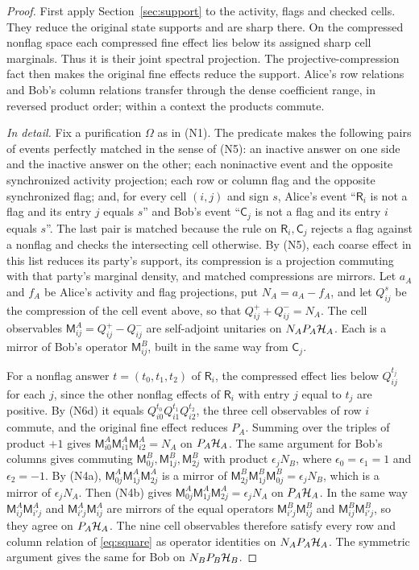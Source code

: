 \begin{proof}
First apply Section~\ref{sec:support} to the activity, flags and checked cells. They reduce the original state supports and are sharp there. On the compressed nonflag space each compressed fine effect lies below its assigned sharp cell marginals. Thus it is their joint spectral projection. The projective-compression fact then makes the original fine effects reduce the support. Alice's row relations and Bob's column relations transfer through the dense coefficient range, in reversed product order; within a context the products commute.

\emph{In detail.} Fix a purification $\Omega$ as in (N1). The predicate makes the following pairs of events perfectly matched in the sense of (N5): an inactive answer on one side and the inactive answer on the other; each noninactive event and the opposite synchronized activity projection; each row or column flag and the opposite synchronized flag; and, for every cell $(i,j)$ and sign $s$, Alice's event ``$\mathsf R_i$ is not a flag and its entry $j$ equals $s$'' and Bob's event ``$\mathsf C_j$ is not a flag and its entry $i$ equals $s$''. The last pair is matched because the rule on $\mathsf R_i,\mathsf C_j$ rejects a flag against a nonflag and checks the intersecting cell otherwise. By (N5), each coarse effect in this list reduces its party's support, its compression is a projection commuting with that party's marginal density, and matched compressions are mirrors. Let $a_A$ and $f_A$ be Alice's activity and flag projections, put $N_A=a_A-f_A$, and let $Q^s_{ij}$ be the compression of the cell event above, so that $Q^+_{ij}+Q^-_{ij}=N_A$. The cell observables $\mathsf M^A_{ij}=Q^+_{ij}-Q^-_{ij}$ are self-adjoint unitaries on $N_AP_A\mathcal H_A$. Each is a mirror of Bob's operator $\mathsf M^B_{ij}$, built in the same way from $\mathsf C_j$.

For a nonflag answer $t=(t_0,t_1,t_2)$ of $\mathsf R_i$, the compressed effect lies below $Q^{t_j}_{ij}$ for each $j$, since the other nonflag effects of $\mathsf R_i$ with entry $j$ equal to $t_j$ are positive. By (N6d) it equals $Q^{t_0}_{i0}Q^{t_1}_{i1}Q^{t_2}_{i2}$, the three cell observables of row $i$ commute, and the original fine effect reduces $P_A$. Summing over the triples of product $+1$ gives $\mathsf M^A_{i0}\mathsf M^A_{i1}\mathsf M^A_{i2}=N_A$ on $P_A\mathcal H_A$. The same argument for Bob's columns gives commuting $\mathsf M^B_{0j},\mathsf M^B_{1j},\mathsf M^B_{2j}$ with product $\epsilon_jN_B$, where $\epsilon_0=\epsilon_1=1$ and $\epsilon_2=-1$. By (N4a), $\mathsf M^A_{0j}\mathsf M^A_{1j}\mathsf M^A_{2j}$ is a mirror of $\mathsf M^B_{2j}\mathsf M^B_{1j}\mathsf M^B_{0j}=\epsilon_jN_B$, which is a mirror of $\epsilon_jN_A$. Then (N4b) gives $\mathsf M^A_{0j}\mathsf M^A_{1j}\mathsf M^A_{2j}=\epsilon_jN_A$ on $P_A\mathcal H_A$. In the same way $\mathsf M^A_{ij}\mathsf M^A_{i'j}$ and $\mathsf M^A_{i'j}\mathsf M^A_{ij}$ are mirrors of the equal operators $\mathsf M^B_{i'j}\mathsf M^B_{ij}$ and $\mathsf M^B_{ij}\mathsf M^B_{i'j}$, so they agree on $P_A\mathcal H_A$. The nine cell observables therefore satisfy every row and column relation of \eqref{eq:square} as operator identities on $N_AP_A\mathcal H_A$. The symmetric argument gives the same for Bob on $N_BP_B\mathcal H_B$.


\end{proof}

